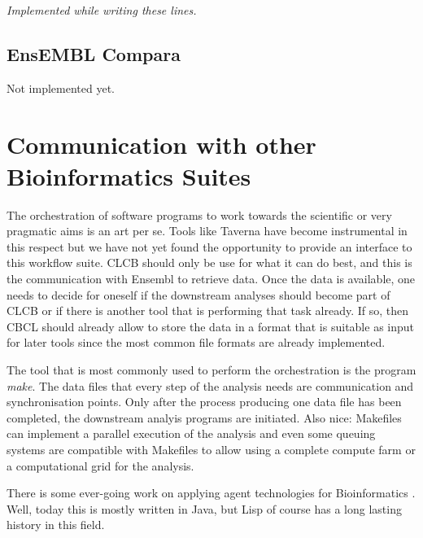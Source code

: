 \documentclass{book}
\newcommand\ensembl{EnsEMBL }
\newcommand\CLCB{CLCB }
\begin{document}
{\em Implemented while writing these lines.}

\subsection{\ensembl Compara}

Not implemented yet.

\section{Communication with other Bioinformatics Suites}

The orchestration of software programs to work towards the scientific
or very pragmatic aims is an art per se. Tools like Taverna have become
instrumental in this respect but we have not yet found the opportunity
to provide an interface to this workflow suite. \CLCB should only be
use for what it can do best, and this is the communication with Ensembl
to retrieve data. Once the data is available, one needs to decide for
oneself if the downstream analyses should become part of \CLCB or if
there is another tool that is performing that task already. If so,
then CBCL should already allow to store the data in a format that is
suitable as input for later tools since the most common file formats
are already implemented.

The tool that is most commonly used to perform the orchestration is 
the program {\em make}. The data files that every step of the analysis needs
are communication and synchronisation points. Only after the process producing one
data file has been completed, the downstream analyis programs are initiated.
Also nice: Makefiles can implement a parallel execution of the analysis and 
even some queuing systems are compatible with Makefiles to allow using a complete
compute farm or a computational grid for the analysis.

There is some ever-going work on applying agent technologies for
Bioinformatics \cite{agents:2007}. Well, today this is mostly written
in Java, but Lisp of course has a long lasting history in this field.




\end{document}
